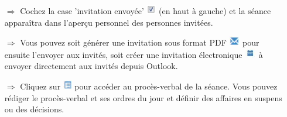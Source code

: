 \documentclass{article}
\begin{document}
\begin{multicols}{2}
\begin{tcolorbox}[colback=blue!5,colframe=blue!40!black,title=Modifier / envoyer une invitation]
\begin{itemize}
  \item[$\Longrightarrow$] Cochez la case 'invitation envoyée' \includegraphics[height=12pt]{Icons/sbox_ok.jpg} (en haut à gauche) et la séance apparaîtra dans l'aperçu personnel des personnes invitées.
  \item[$\Longrightarrow$] Vous pouvez soit générer une invitation sous format PDF \includegraphics[height=12pt]{Icons/Briefsymbol.jpg} pour ensuite l'envoyer aux invités, soit créer une invitation électronique \includegraphics[height=12pt]{Icons/Kalendersymbol.jpg} à envoyer directement aux invités depuis Outlook.
  \item[$\Longrightarrow$] Cliquez sur \includegraphics[height=12pt]{Icons/Listensymbol.jpg} pour accéder au procès-verbal de la séance. Vous pouvez rédiger le procès-verbal et ses ordres du jour et définir des affaires en suspens ou des décisions.		
\end{itemize}
\end{tcolorbox}


\end{multicols}

\end{document}
